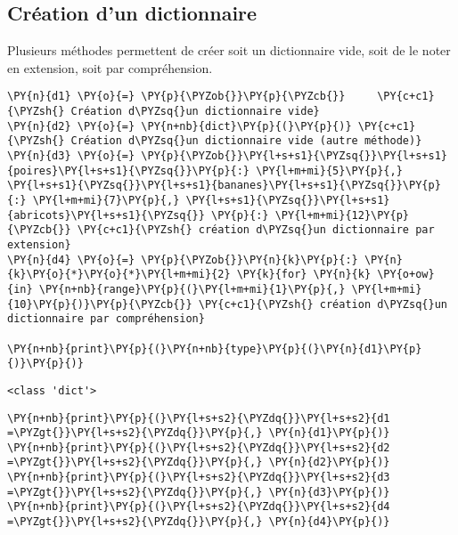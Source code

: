 \documentclass[12pt]{book}
\begin{document}
    \hypertarget{cruxe9ation-dun-dictionnaire}{%
\subsection{Création d'un
dictionnaire}\label{cruxe9ation-dun-dictionnaire}}

Plusieurs méthodes permettent de créer soit un dictionnaire vide, soit
de le noter en extension, soit par compréhension.

    \begin{tcolorbox}[breakable, size=fbox, boxrule=1pt, pad at break*=1mm,colback=cellbackground, colframe=cellborder]
\begin{Verbatim}[commandchars=\\\{\}]
\PY{n}{d1} \PY{o}{=} \PY{p}{\PYZob{}}\PY{p}{\PYZcb{}}     \PY{c+c1}{\PYZsh{} Création d\PYZsq{}un dictionnaire vide}
\PY{n}{d2} \PY{o}{=} \PY{n+nb}{dict}\PY{p}{(}\PY{p}{)} \PY{c+c1}{\PYZsh{} Création d\PYZsq{}un dictionnaire vide (autre méthode)}
\PY{n}{d3} \PY{o}{=} \PY{p}{\PYZob{}}\PY{l+s+s1}{\PYZsq{}}\PY{l+s+s1}{poires}\PY{l+s+s1}{\PYZsq{}}\PY{p}{:} \PY{l+m+mi}{5}\PY{p}{,} \PY{l+s+s1}{\PYZsq{}}\PY{l+s+s1}{bananes}\PY{l+s+s1}{\PYZsq{}}\PY{p}{:} \PY{l+m+mi}{7}\PY{p}{,} \PY{l+s+s1}{\PYZsq{}}\PY{l+s+s1}{abricots}\PY{l+s+s1}{\PYZsq{}} \PY{p}{:} \PY{l+m+mi}{12}\PY{p}{\PYZcb{}} \PY{c+c1}{\PYZsh{} création d\PYZsq{}un dictionnaire par extension}
\PY{n}{d4} \PY{o}{=} \PY{p}{\PYZob{}}\PY{n}{k}\PY{p}{:} \PY{n}{k}\PY{o}{*}\PY{o}{*}\PY{l+m+mi}{2} \PY{k}{for} \PY{n}{k} \PY{o+ow}{in} \PY{n+nb}{range}\PY{p}{(}\PY{l+m+mi}{1}\PY{p}{,} \PY{l+m+mi}{10}\PY{p}{)}\PY{p}{\PYZcb{}} \PY{c+c1}{\PYZsh{} création d\PYZsq{}un dictionnaire par compréhension}

\PY{n+nb}{print}\PY{p}{(}\PY{n+nb}{type}\PY{p}{(}\PY{n}{d1}\PY{p}{)}\PY{p}{)}
\end{Verbatim}
\end{tcolorbox}

    \begin{Verbatim}[commandchars=\\\{\}]
<class 'dict'>
    \end{Verbatim}

    \begin{tcolorbox}[breakable, size=fbox, boxrule=1pt, pad at break*=1mm,colback=cellbackground, colframe=cellborder]
\begin{Verbatim}[commandchars=\\\{\}]
\PY{n+nb}{print}\PY{p}{(}\PY{l+s+s2}{\PYZdq{}}\PY{l+s+s2}{d1 =\PYZgt{}}\PY{l+s+s2}{\PYZdq{}}\PY{p}{,} \PY{n}{d1}\PY{p}{)}
\PY{n+nb}{print}\PY{p}{(}\PY{l+s+s2}{\PYZdq{}}\PY{l+s+s2}{d2 =\PYZgt{}}\PY{l+s+s2}{\PYZdq{}}\PY{p}{,} \PY{n}{d2}\PY{p}{)}
\PY{n+nb}{print}\PY{p}{(}\PY{l+s+s2}{\PYZdq{}}\PY{l+s+s2}{d3 =\PYZgt{}}\PY{l+s+s2}{\PYZdq{}}\PY{p}{,} \PY{n}{d3}\PY{p}{)}
\PY{n+nb}{print}\PY{p}{(}\PY{l+s+s2}{\PYZdq{}}\PY{l+s+s2}{d4 =\PYZgt{}}\PY{l+s+s2}{\PYZdq{}}\PY{p}{,} \PY{n}{d4}\PY{p}{)}
\end{Verbatim}
\end{tcolorbox}
\end{document}
